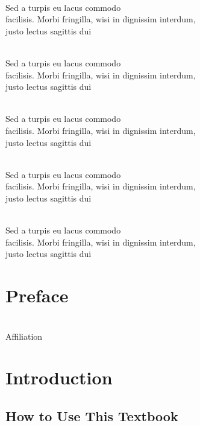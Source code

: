 \begin{contrib}
\\
Sed a turpis eu lacus commodo\\
facilisis. Morbi fringilla, wisi in dignissim interdum,\\
justo lectus sagittis dui

\\
Sed a turpis eu lacus commodo\\
facilisis. Morbi fringilla, wisi in dignissim interdum,\\
justo lectus sagittis dui

\\
Sed a turpis eu lacus commodo\\
facilisis. Morbi fringilla, wisi in dignissim interdum,\\
justo lectus sagittis dui

\\
Sed a turpis eu lacus commodo\\
facilisis. Morbi fringilla, wisi in dignissim interdum,\\
justo lectus sagittis dui

\\
Sed a turpis eu lacus commodo\\
facilisis. Morbi fringilla, wisi in dignissim interdum,\\
justo lectus sagittis dui
\end{contrib}


\clearemptydoublepage

\chapter*{Preface}

\lipsum[5]

\lipsum[5]

\begin{flushright}
\\
Affiliation
\end{flushright}

\chapter*{Introduction}


\section*{How to Use This Textbook}

\lipsum[5]

\lipsum[5]

